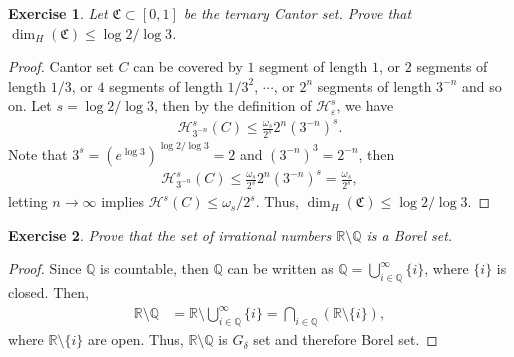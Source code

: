 \documentclass[11pt]{book}
\newtheorem{exercise}{Exercise}[section]
\theoremstyle{definition}
\numberwithin{equation}{chapter}
\def\CC{\mathfrak{C}}
\def\H{{\mathcal H}}
\begin{document}
\begin{exercise}
Let $\CC \subset [0,1]$ be the ternary Cantor set. Prove that $\dim_{H}(\CC) \leq \log 2/\log 3$.
\end{exercise}
\begin{proof}
Cantor set $C$ can be covered by $1$ segment of length $1$, or $2$ segments of length $1/3$, or $4$ segments of length $1/3^2$, $\cdots$, or $2^n$ segments of length $3^{-n}$ and so on. Let $s = \log 2/\log 3$, then by the definition of $\H^s_{\varepsilon}$, we have
\begin{align*}
    \H^s_{3^{-n}}(C) \leq \frac{\omega_s}{2^s} 2^n \left(3^{-n}\right)^s.
\end{align*}
Note that $3^s = \left(e^{\log 3}\right)^{\log 2/\log 3} = 2$ and $\left(3^{-n}\right)^3 = 2^{-n}$, then 
\begin{align*}
    \H^s_{3^{-n}}(C) \leq \frac{\omega_s}{2^s} 2^n \left(3^{-n}\right)^s = \frac{\omega_s}{2^s},
\end{align*}
letting $n \to \infty$ implies $\H^s(C) \leq \omega_s / 2^s$. Thus, $\dim_{H}(\CC) \leq \log 2/\log 3$.
\end{proof}

\medskip

\begin{exercise}
Prove that the set of irrational numbers $\mathbb{R} \setminus \mathbb{Q}$ is a Borel set.
\end{exercise}
\begin{proof}
Since $\mathbb{Q}$ is countable, then $\mathbb{Q}$ can be written as $\mathbb{Q} = \bigcup^\infty_{i \in \mathbb{Q}}\{i\}$, where $\{i\}$ is closed. Then,
\begin{align*}
    \mathbb{R} \setminus \mathbb{Q} & = \mathbb{R} \setminus \bigcup^\infty_{i \in \mathbb{Q}}\{i\} = \bigcap_{i \in \mathbb{Q}} \left(\mathbb{R} \setminus \{i\} \right),
\end{align*}
where $\mathbb{R} \setminus \{i\}$ are open. Thus, $\mathbb{R} \setminus \mathbb{Q}$ is $G_\delta$ set and therefore Borel set.
\end{proof}

\medskip
\end{document}
